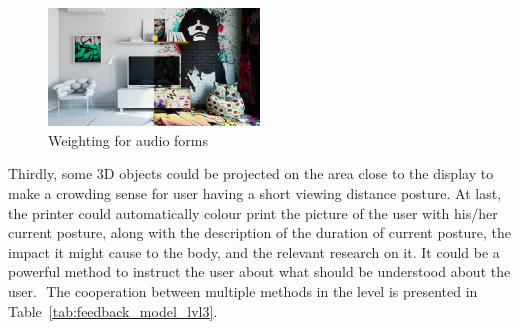 \begin{figure}[h]
\centering
  \includegraphics[width=0.5\textwidth]{figs/halfroom}
\caption{Weighting for audio forms}
\label{fig:halfroom}
\end{figure}

Thirdly, some 3D objects could be projected on the area close to the display to make a crowding sense for user having a short viewing distance posture. At last, the printer could automatically colour print the picture of the user with his/her current posture, along with the description of the duration of current posture, the impact it might cause to the body, and the relevant research on it. It could be a powerful method to instruct the user about what should be understood about the user.  The cooperation between multiple methods in the level is presented in Table~\ref{tab:feedback_model_lvl3}. 

